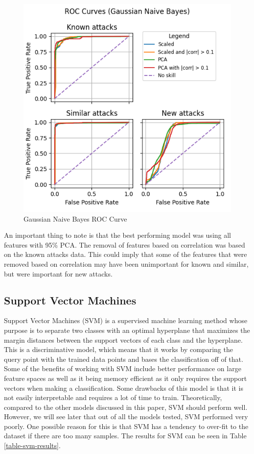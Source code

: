 \documentclass[journal]{IEEEtran}
\begin{document}
\begin{figure}
    \centering
    \includegraphics[width=\linewidth]{figures/Gaussian Naive Bayes_roc_all_small.png}
    \caption{Gaussian Naive Bayes ROC Curve}
    \label{fig:gaus_roc}
\end{figure}

An important thing to note is that the best performing model was using all features with 95\% PCA. The removal of features based on correlation was based on the known attacks data. This could imply that some of the features that were removed based on correlation may have been unimportant for known and similar, but were important for new attacks.




\subsection{Support Vector Machines}
Support Vector Machines (SVM) is a supervised machine learning method whose purpose is to separate two classes with an optimal hyperplane that maximizes the margin distances between the support vectors of each class and the hyperplane. This is a discriminative model, which means that it works by comparing the query point with the trained data points and bases the classification off of that. Some of the benefits of working with SVM include better performance on large feature spaces as well as it being memory efficient as it only requires the support vectors when making a classification. Some drawbacks of this model is that it is not easily interpretable and requires a lot of time to train. Theoretically, compared to the other models discussed in this paper, SVM should perform well. However, we will see later that out of all the models tested, SVM performed very poorly. One possible reason for this is that SVM has a tendency to over-fit to the dataset if there are too many samples. The results for SVM can be seen in Table \ref{table-svm-results}.
\end{document}
